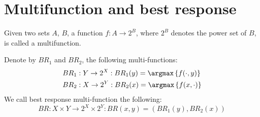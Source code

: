 \section{Multifunction and best response}

\begin{definition}
    Given two sets $A$, $B$, a function $f:A\rightarrow 2^B$, where $2^B$ denotes the power set of $B$, is called a multifunction. 
\end{definition}
\begin{definition}
    Denote by $BR_1$ and $BR_2$, the following multi-functions: 
    \begin{align*}
        &BR_1:Y\rightarrow 2^X:BR_1(y)=\argmax\left\{f(\cdot,y)\right\} \\
        &BR_2:X\rightarrow 2^Y:BR_2(x)=\argmax\left\{f(x,\cdot)\right\} 
    \end{align*}
    We call best response multi-function the following: 
    \[BR:X\times Y\rightarrow 2^X\times 2^Y:BR(x,y)=(BR_1(y),BR_2(x))\]
\end{definition}